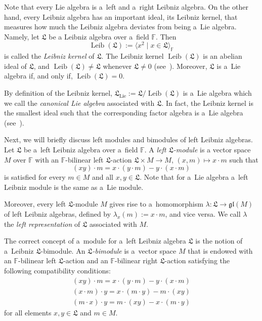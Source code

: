 \documentclass{jonasart}
\DeclareMathOperator{\leib}{Leib}
\DeclareMathOperator{\lie}{Lie}
\newcommand{\fbb}{\mathbb{F}}
\newcommand{\gl}{\mathfrak{gl}}
\newcommand{\lf}{\mathfrak{L}}
\begin{document}
	Note that every Lie algebra is a~left and a~right Leibniz algebra. On the other hand, every Leibniz algebra has an important ideal, its Leibniz kernel, that measures how much the Leibniz algebra deviates from being a~Lie algebra. Namely, let $\lf$ be a
	Leibniz algebra over a~field $\fbb$. Then
	\[
		\leib(\lf):=\langle x^2\mid x\in\lf\rangle_\fbb
	\]
	is called the \emph{Leibniz kernel\/} of $\lf$. The Leibniz kernel $\leib(\lf)$ is an abelian ideal of $\lf$, and $\leib(\lf)\ne\lf$ whenever $\lf\ne 0$ (see~\cite[Proposition 2.20]{F1}). Moreover, $\lf$ is a~Lie algebra if, and only if, $\leib(\lf)=0$.

	By definition of the Leibniz kernel, $\lf_{\lie}:=\lf/\leib(\lf)$ is a~Lie algebra which we call the \emph{canonical Lie algebra\/} associated with $\lf$. In fact, the Leibniz kernel is the smallest ideal such that the corresponding factor algebra is a~Lie algebra (see~\cite[Proposition~2.22]{F1}).

	Next, we will briefly discuss left modules and bimodules of left Leibniz algebras. Let
	$\lf$ be a~left Leibniz algebra over a~field $\fbb$. A \emph{left $\lf$-module\/} is a vector space $M$ over $\fbb$ with an $\fbb$-bilinear left $\lf$-action $\lf\times M\to
	M$, $(x,m)\mapsto x\cdot m$ such that
	\[
		(xy)\cdot m=x\cdot(y\cdot m)-y\cdot(x\cdot m)
	\]
	is satisfied for every $m\in M$ and all $x,y\in\lf$. Note that for a~Lie algebra a~left
	Leibniz module is the same as a~Lie module.

	Moreover, every left $\lf$-module $M$ gives rise to a~homomorphism $\lambda:\lf\to
	\gl(M)$ of left Leibniz algebras, defined by $\lambda_x (m):=x\cdot m$, and vice versa. We call $\lambda$ the \emph{left representation\/} of $\lf$ associated with $M$.

	The correct concept of a~module for a~left Leibniz algebra $\lf$ is the notion of a~Leibniz
	$\lf$-bimodule. An \emph{$\lf$-bimodule\/} is a~vector space $M$ that is endowed with an $\fbb$-bilinear left $\lf$-action and an $\fbb$-bilinear right $\lf$-action satisfying the following compatibility conditions:
		\begin{gather}
		\tag{LLM}
        (xy)\cdot m=x\cdot(y\cdot m)-y\cdot(x\cdot m) \\
		\tag{LML}
        (x\cdot m)\cdot y=x\cdot(m\cdot y)-m\cdot(xy) \\
		\tag{MLL}
        (m\cdot x)\cdot y=m\cdot(xy)-x\cdot(m\cdot y)
	\end{gather}
    for all elements $x,y\in\lf$ and $m\in M$.
\end{document}
